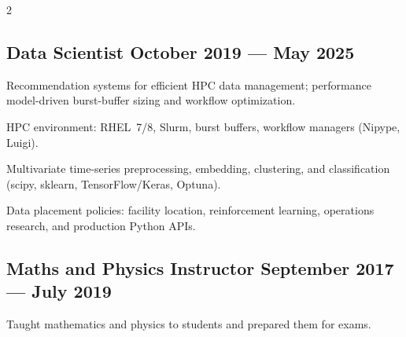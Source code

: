\begin{multicols}{2}
\subsection{Data Scientist \hfill October 2019 --- May 2025}
\begin{zitemize}
\item Recommendation systems for efficient HPC data management; performance model-driven burst-buffer sizing and workflow optimization.
\item HPC environment: RHEL~7/8, Slurm, burst buffers, workflow managers (Nipype, Luigi).
\item Multivariate time-series preprocessing, embedding, clustering, and classification (scipy, sklearn, TensorFlow/Keras, Optuna).
\item Data placement policies: facility location, reinforcement learning, operations research, and production Python APIs.
\end{zitemize}

\subsection{Maths and Physics Instructor \hfill September 2017 --- July 2019}
\begin{zitemize}
\item Taught mathematics and physics to students and prepared them for exams.
\end{zitemize}


\end{multicols}
